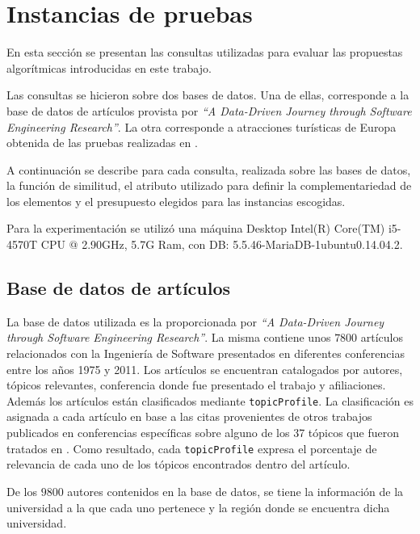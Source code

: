 \section{Instancias de pruebas}\label{sect:busquedas}
En esta sección se presentan las consultas utilizadas para evaluar las propuestas algorítmicas introducidas en este trabajo. 

Las consultas se hicieron sobre dos bases de datos. Una de ellas, corresponde a la base de datos de artículos provista por \textit{\textquotedblleft A Data-Driven Journey through Software Engineering Research\textquotedblright}\cite{dataDrive}. La otra corresponde a atracciones turísticas de Europa obtenida de las pruebas realizadas en \cite{journals/tkde/Amer-YahiaBCFMZ14}.

A continuación se describe para cada consulta, realizada sobre las bases de datos, la función de similitud, el atributo utilizado para definir la complementariedad de los elementos y el presupuesto elegidos para las instancias escogidas. 

Para la experimentación se utilizó una máquina Desktop Intel(R) Core(TM) i5-4570T CPU @ 2.90GHz, 5.7G Ram, con DB: 5.5.46-MariaDB-1ubuntu0.14.04.2.

\subsection{Base de datos de artículos}
La base de datos utilizada es la proporcionada por \textit{\textquotedblleft A Data-Driven Journey through Software Engineering Research\textquotedblright}\cite{dataDrive}. La misma contiene unos $7800$ artículos relacionados con la Ingeniería de Software presentados en diferentes conferencias entre los años 1975 y 2011. Los artículos se encuentran catalogados por autores, tópicos relevantes, conferencia donde fue presentado el trabajo y afiliaciones. Además los artículos están clasificados mediante \texttt{topicProfile}. La clasificación es asignada a cada artículo en base a las citas provenientes de otros trabajos publicados en conferencias específicas sobre alguno de los 37 tópicos que fueron tratados en \cite{dataDrive}. Como resultado, cada \texttt{topicProfile} expresa el porcentaje de relevancia de cada uno de los tópicos encontrados dentro del artículo. 

De los $9800$ autores contenidos en la base de datos, se tiene la información de la universidad a la que cada uno pertenece y la región donde se encuentra dicha universidad.

